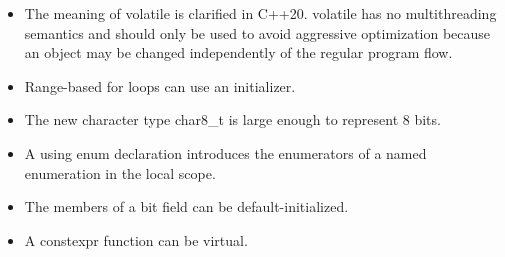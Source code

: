 \begin{tcolorbox}[colback=mygreen!5!white,colframe=mygreen!75!black,title={Distilled Information}]
\begin{itemize}
\item 
The meaning of volatile is clarified in C++20. volatile has no multithreading semantics and should only be used to avoid aggressive optimization because an object may be changed independently of the regular program flow.

\item 
Range-based for loops can use an initializer.

\item 
The new character type char8\_t is large enough to represent 8 bits.

\item 
A using enum declaration introduces the enumerators of a named enumeration in the local scope.

\item 
The members of a bit field can be default-initialized.

\item 
A constexpr function can be virtual.
\end{itemize}
\end{tcolorbox}
























